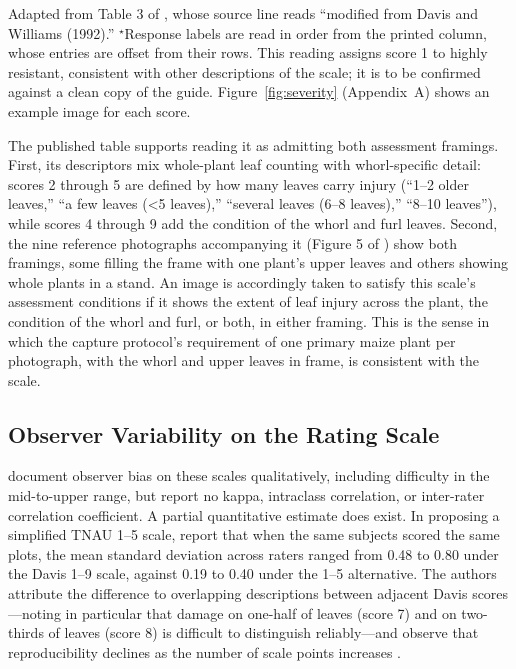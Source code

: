 \documentclass{icsthesis}
\begin{document}
\begin{mainmatter}
\begin{table}[htbp]
					\vspace{1ex}
					\begin{minipage}{0.85\textwidth}
					\singlespacing\footnotesize
					Adapted from Table 3 of \citet{prasanna2018}, whose source line reads ``modified
					from Davis and Williams (1992).'' $^{\star}$Response labels are read in order
					from the printed column, whose entries are offset from their rows. This reading
					assigns score 1 to highly resistant, consistent with other descriptions of the
					scale; it is to be confirmed against a clean copy of the guide. Figure~\ref{fig:severity}
					(Appendix~A) shows an example image for each score.
					\end{minipage}
				\vspace{4ex}
				\end{table}

				The published table supports reading it as admitting both assessment framings.
				First, its descriptors mix whole-plant leaf counting with whorl-specific detail:
				scores 2 through 5 are defined by how many leaves carry injury (``1--2 older
				leaves,'' ``a few leaves (\textless 5 leaves),'' ``several leaves (6--8 leaves),''
				``8--10 leaves''), while scores 4 through 9 add the condition of the whorl and furl
				leaves. Second, the nine reference photographs accompanying it (Figure 5 of
				\citealp{prasanna2018}) show both framings, some filling the frame with one plant's
				upper leaves and others showing whole plants in a stand. An image is accordingly
				taken to satisfy this scale's assessment conditions if it shows the extent of leaf
				injury across the plant, the condition of the whorl and furl, or both, in either
				framing. This is the sense in which the capture protocol's requirement of one
				primary maize plant per photograph, with the whorl and upper leaves in frame, is
				consistent with the scale.

			\subsection{Observer Variability on the Rating Scale}\label{sec:observer}

				\citet{toepfer2021} document observer bias on these scales qualitatively, including
				difficulty in the mid-to-upper range, but report no kappa, intraclass correlation,
				or inter-rater correlation coefficient. A partial quantitative estimate does exist.
				In proposing a simplified TNAU 1--5 scale, \citet{srinivasan2022} report that when
				the same subjects scored the same plots, the mean standard deviation across raters
				ranged from 0.48 to 0.80 under the Davis 1--9 scale, against 0.19 to 0.40 under the
				1--5 alternative. The authors attribute the difference to overlapping descriptions
				between adjacent Davis scores---noting in particular that damage on one-half of
				leaves (score 7) and on two-thirds of leaves (score 8) is difficult to distinguish
				reliably---and observe that reproducibility declines as the number of scale points
				increases \citep{srinivasan2022}.


\end{mainmatter}
\end{document}
